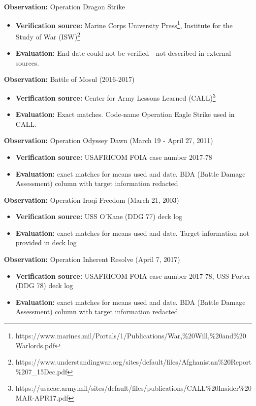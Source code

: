 \documentclass[fleqn,12pt]{article}
\begin{document}
\textbf{Observation:} Operation Dragon Strike
\begin{itemize}
    \item \textbf{Verification source:} Marine Corps University Press\footnote{https://www.marines.mil/Portals/1/Publications/War,\%20Will,\%20and\%20Warlords.pdf}, Institute for the Study of War (ISW)\footnote{https://www.understandingwar.org/sites/default/files/Afghanistan\%20Report\%207_15Dec.pdf}
    \item \textbf{Evaluation:} End date could not be verified - not described in external sources.
\end{itemize}

\textbf{Observation:} Battle of Mosul (2016-2017)
\begin{itemize}
    \item \textbf{Verification source:} Center for Army Lessons Learned (CALL)\footnote{https://usacac.army.mil/sites/default/files/publications/CALL\%20Insider\%20MAR-APR17.pdf}
    \item \textbf{Evaluation:} Exact matches. Code-name Operation Eagle Strike used in CALL.
\end{itemize}

\textbf{Observation:} Operation Odyssey Dawn (March 19 - April 27, 2011)
\begin{itemize}
    \item \textbf{Verification source:} USAFRICOM FOIA case number 2017-78
    \item \textbf{Evaluation:} exact matches for means used and date. BDA (Battle Damage Assessment) column with target information redacted
\end{itemize}

\textbf{Observation:} Operation Iraqi Freedom (March 21, 2003)
\begin{itemize}
    \item \textbf{Verification source:} USS O'Kane (DDG 77) deck log
    \item \textbf{Evaluation:} exact matches for means used and date. Target information not provided in deck log
\end{itemize}

\textbf{Observation:} Operation Inherent Resolve (April 7, 2017)
\begin{itemize}
    \item \textbf{Verification source:} USAFRICOM FOIA case number 2017-78, USS Porter (DDG 78) deck log
    \item \textbf{Evaluation:} exact matches for means used and date. BDA (Battle Damage Assessment) column with target information redacted
\end{itemize}
\end{document}
